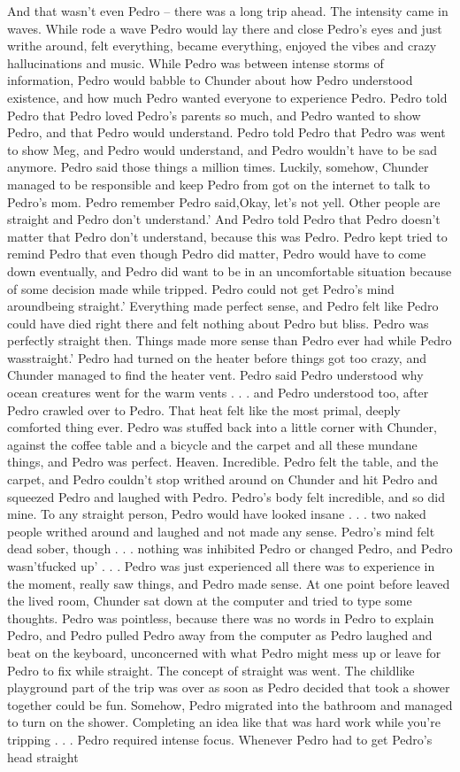 \documentclass[12pt]{book}
\begin{document}
And that wasn't even Pedro -- there was a long trip ahead. The intensity came in waves. While rode a wave Pedro would lay there and close Pedro's eyes and just writhe around, felt everything, became everything, enjoyed the vibes and crazy hallucinations and music. While Pedro was between intense storms of information, Pedro would babble to Chunder about how Pedro understood existence, and how much Pedro wanted everyone to experience Pedro. Pedro told Pedro that Pedro loved Pedro's parents so much, and Pedro wanted to show Pedro, and that Pedro would understand. Pedro told Pedro that Pedro was went to show Meg, and Pedro would understand, and Pedro wouldn't have to be sad anymore. Pedro said those things a million times. Luckily, somehow, Chunder managed to be responsible and keep Pedro from got on the internet to talk to Pedro's mom. Pedro remember Pedro said,Okay, let's not yell. Other people are straight and Pedro don't understand.' And Pedro told Pedro that Pedro doesn't matter that Pedro don't understand, because this was Pedro. Pedro kept tried to remind Pedro that even though Pedro did matter, Pedro would have to come down eventually, and Pedro did want to be in an uncomfortable situation because of some decision made while tripped. Pedro could not get Pedro's mind aroundbeing straight.' Everything made perfect sense, and Pedro felt like Pedro could have died right there and felt nothing about Pedro but bliss. Pedro was perfectly straight then. Things made more sense than Pedro ever had while Pedro wasstraight.' Pedro had turned on the heater before things got too crazy, and Chunder managed to find the heater vent. Pedro said Pedro understood why ocean creatures went for the warm vents . . .  and Pedro understood too, after Pedro crawled over to Pedro. That heat felt like the most primal, deeply comforted thing ever. Pedro was stuffed back into a little corner with Chunder, against the coffee table and a bicycle and the carpet and all these mundane things, and Pedro was perfect. Heaven. Incredible. Pedro felt the table, and the carpet, and Pedro couldn't stop writhed around on Chunder and hit Pedro and squeezed Pedro and laughed with Pedro. Pedro's body felt incredible, and so did mine. To any straight person, Pedro would have looked insane . . .  two naked people writhed around and laughed and not made any sense. Pedro's mind felt dead sober, though . . .  nothing was inhibited Pedro or changed Pedro, and Pedro wasn'tfucked up' . . .  Pedro was just experienced all there was to experience in the moment, really saw things, and Pedro made sense. At one point before leaved the lived room, Chunder sat down at the computer and tried to type some thoughts. Pedro was pointless, because there was no words in Pedro to explain Pedro, and Pedro pulled Pedro away from the computer as Pedro laughed and beat on the keyboard, unconcerned with what Pedro might mess up or leave for Pedro to fix while straight. The concept of straight was went. The childlike playground part of the trip was over as soon as Pedro decided that took a shower together could be fun. Somehow, Pedro migrated into the bathroom and managed to turn on the shower. Completing an idea like that was hard work while you're tripping . . .  Pedro required intense focus. Whenever Pedro had to get Pedro's head straight 
\end{document}
